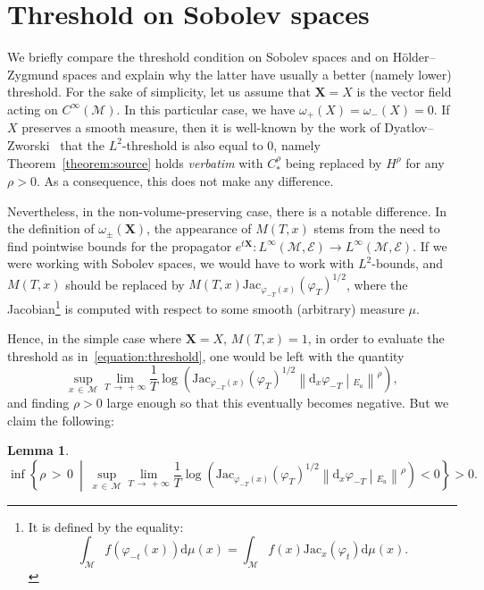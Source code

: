 \documentclass[10pt]{amsart}
\newtheorem{lemm}[theo]{Lemma}\newtheorem{prop}[theo]{Proposition}\newtheorem{coro}[theo]{Corollary}\newtheorem{conj}[theo]{Conjecture}
\theoremstyle{definition}\newtheorem{defi}[theo]{Definition}\newtheorem{rema}[theo]{Remark}\newtheorem{exam}[theo]{Example}\newtheorem{exem}[theo]{Example}\newtheorem{nota}[theo]{Notation}
\newcommand{\X}{\mathbf{X}}
\newcommand{\mc}{\mathcal}
\newcommand{\M}{\mathcal{M}}
\newcommand{\E}{\mathcal{E}}
\newcommand{\dd}{\mathrm{d}}
\newcommand{\Jac}{\mathrm{Jac}}
\begin{document}
\section{Threshold on Sobolev spaces}
\label{appendix:b}

We briefly compare the threshold condition on Sobolev spaces and on H\"older--Zygmund spaces and explain why the latter have usually a better (namely lower) threshold. For the sake of simplicity, let us assume that $\X = X$ is the vector field acting on $C^\infty(\M)$. In this particular case, we have $\omega_+(X)=\omega_-(X)=0$. If $X$ preserves a smooth measure, then it is well-known by the work of Dyatlov--Zworski~\cite[Appendix~E]{Dyatlov-Zworski-19} that the $L^2$-threshold is also equal to $0$, namely Theorem~\ref{theorem:source} holds \emph{verbatim} with $C^\rho_*$ being replaced by $H^\rho$ for any $\rho > 0$. As a consequence, this does not make any difference.

Nevertheless, in the non-volume-preserving case, there is a notable difference. In the definition of $\omega_{\pm}(\X)$, the appearance of $M(T,x)$ stems from the need to find pointwise bounds for the propagator $e^{t\X}:L^\infty(\M,\E) \to L^\infty(\M,\E)$. If we were working with Sobolev spaces, we would have to work with $L^2$-bounds, and $M(T,x)$ should be replaced by $M(T,x) \Jac_{\varphi_{-T}(x)}(\varphi_T)^{1/2}$, where the Jacobian\footnote{It is defined by the equality:
\[
\int_{\mc{M}} f(\varphi_{-t}(x)) \dd \mu(x) = \int_{\M} f(x) \Jac_x(\varphi_t) \dd \mu(x).
\]
} is computed with respect to some smooth (arbitrary) measure $\mu$.

Hence, in the simple case where $\X = X$, $M(T,x)=1$, in order to evaluate the threshold as in~\eqref{equation:threshold}, one would be left with the quantity
\begin{equation}\label{equation:threshold-l2}
\sup_{x\,\in\,\M} \lim_{T\,\to\,+\infty} \frac{1}{T}\log \left(\Jac_{\varphi_{-T}(x)}(\varphi_T)^{1/2} \left\| \dd_x \varphi_{-T}\middle|_{E_u} \right\|^\rho\right),
\end{equation}
and finding $\rho > 0$ large enough so that this eventually becomes negative. But we claim the following:

\begin{lemm}
\[
\inf\left\{ \rho\,>\,0~\middle|~\sup_{x\,\in\,\M} \lim_{T\,\to\,+\infty} \frac{1}{T}\log \left(\Jac_{\varphi_{-T}(x)}(\varphi_T)^{1/2} \left\| \dd_x \varphi_{-T}\middle|_{E_u} \right\|^\rho\right) < 0\right\} > 0.
\]
\end{lemm}
\end{document}

